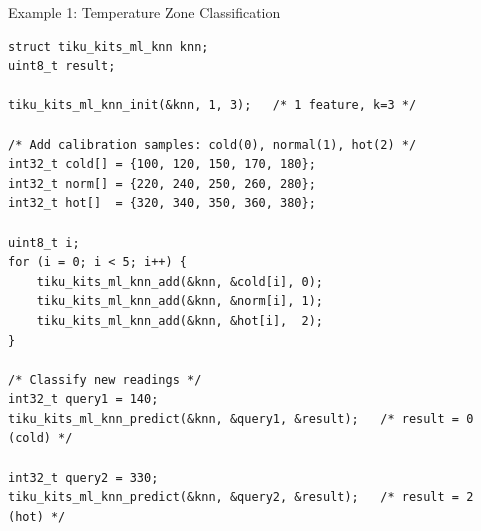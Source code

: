 \documentclass[aspectratio=169, 10pt]{beamer}
\begin{document}
\begin{frame}[fragile]{Example 1: Temperature Zone Classification}
\begin{lstlisting}[style=cstyle,
  title={examples/example\_ml\_knn.c --- 3 zones with k=3}]
struct tiku_kits_ml_knn knn;
uint8_t result;

tiku_kits_ml_knn_init(&knn, 1, 3);   /* 1 feature, k=3 */

/* Add calibration samples: cold(0), normal(1), hot(2) */
int32_t cold[] = {100, 120, 150, 170, 180};
int32_t norm[] = {220, 240, 250, 260, 280};
int32_t hot[]  = {320, 340, 350, 360, 380};

uint8_t i;
for (i = 0; i < 5; i++) {
    tiku_kits_ml_knn_add(&knn, &cold[i], 0);
    tiku_kits_ml_knn_add(&knn, &norm[i], 1);
    tiku_kits_ml_knn_add(&knn, &hot[i],  2);
}

/* Classify new readings */
int32_t query1 = 140;
tiku_kits_ml_knn_predict(&knn, &query1, &result);   /* result = 0 (cold) */

int32_t query2 = 330;
tiku_kits_ml_knn_predict(&knn, &query2, &result);   /* result = 2 (hot) */
\end{lstlisting}
\end{frame}
\end{document}
